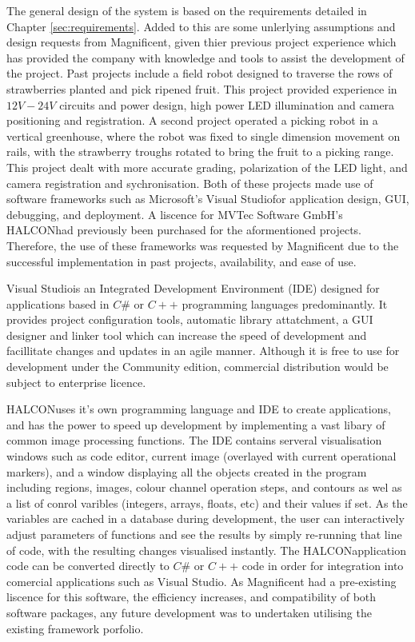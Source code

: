 \documentclass[fleqn,twoside]{article}
\begin{document}
The general design of the system is based on the requirements detailed in Chapter \ref{sec:requirements}. Added to this are some unlerlying assumptions and design requests from Magnificent, given thier previous project experience which has provided the company with knowledge and tools to assist the development of the project. Past projects include a field robot designed to traverse the rows of strawberries planted and pick ripened fruit. This project provided experience in $12V-24V$ circuits and power design, high power LED illumination and camera positioning and registration. A second project operated a picking robot in a vertical greenhouse, where the robot was fixed to single dimension movement on rails, with the strawberry troughs rotated to bring the fruit to a picking range. This project dealt with more accurate grading, polarization of the LED light, and camera registration and sychronisation. Both of these projects made use of software frameworks such as Microsoft's Visual Studio\textregistered for application design, GUI, debugging, and deployment. A liscence for MVTec Software GmbH's HALCON\texttrademark had previously been purchased for the aformentioned projects. Therefore, the use of these frameworks was requested by Magnificent due to the successful implementation in past projects, availability, and ease of use.

Visual Studio\textregistered is an Integrated Development Environment (IDE) designed for applications based in $C\#$ or $C++$ programming languages predominantly. It provides project configuration tools, automatic library attatchment, a GUI designer and linker tool which can increase the speed of development and facillitate changes and updates in an agile manner. Although it is free to use for development under the Community edition, commercial distribution would be subject to enterprise licence. 

HALCON\texttrademark uses it's own programming language and IDE to create applications, and has the power to speed up development by implementing a vast libary of common image processing functions. The IDE contains serveral visualisation windows such as code editor, current image (overlayed with current operational markers), and a window displaying all the objects created in the program including regions, images, colour channel operation steps, and contours as wel as a list of conrol varibles (integers, arrays, floats, etc) and their values if set. As the variables are cached in a database during development, the user can interactively adjust parameters of functions and see the results by simply re-running that line of code, with the resulting changes visualised instantly. The HALCON\texttrademark application code can be converted directly to $C\#$ or $C++$ code in order for integration into comercial applications such as Visual Studio\textregistered. As Magnificent had a pre-existing liscence for this software, the efficiency increases, and compatibility of both software packages, any future development was to undertaken utilising the existing framework porfolio.
\end{document}
